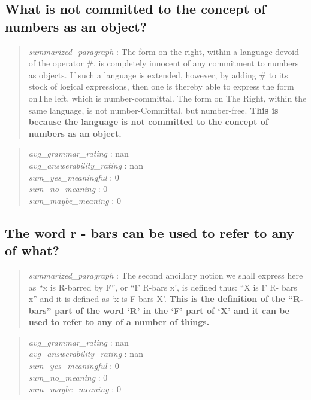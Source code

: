 \hypertarget{what-is-not-committed-to-the-concept-of-numbers-as-an-object-1}{%
\subsection{What is not committed to the concept of numbers as an
object?}\label{what-is-not-committed-to-the-concept-of-numbers-as-an-object-1}}

\begin{quote}
\emph{summarized\_paragraph} : The form on the right, within a language
devoid of the operator \#, is completely innocent of any commitment to
numbers as objects. If such a language is extended, however, by adding
\# to its stock of logical expressions, then one is thereby able to
express the form onThe left, which is number-committal. The form on The
Right, within the same language, is not number-Committal, but
number-free. \textbf{This is because the language is not committed to
the concept of numbers as an object.}
\end{quote}

\begin{quote}
\emph{avg\_grammar\_rating} : nan\\
\emph{avg\_answerability\_rating} : nan\\
\emph{sum\_yes\_meaningful} : 0\\
\emph{sum\_no\_meaning} : 0\\
\emph{sum\_maybe\_meaning} : 0
\end{quote}

\hypertarget{the-word-r---bars-can-be-used-to-refer-to-any-of-what}{%
\subsection{The word r - bars can be used to refer to any of
what?}\label{the-word-r---bars-can-be-used-to-refer-to-any-of-what}}

\begin{quote}
\emph{summarized\_paragraph} : The second ancillary notion we shall
express here as ``x is R-barred by F'', or ``F R-bars x', is defined
thus: ``X is F R- bars x'' and it is defined as `x is F-bars X'.
\textbf{This is the definition of the ``R-bars'' part of the word `R' in
the `F' part of `X' and it can be used to refer to any of a number of
things.}
\end{quote}

\begin{quote}
\emph{avg\_grammar\_rating} : nan\\
\emph{avg\_answerability\_rating} : nan\\
\emph{sum\_yes\_meaningful} : 0\\
\emph{sum\_no\_meaning} : 0\\
\emph{sum\_maybe\_meaning} : 0
\end{quote}

